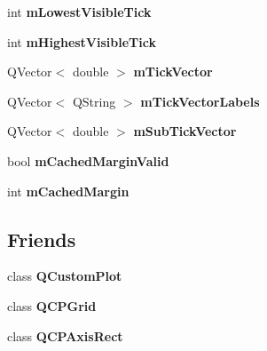 \begin{DoxyCompactItemize}
\item 
\hypertarget{classQCPAxis_aebb24ba8734b7e054efc6e1ecc5414c7}{}int {\bfseries m\+Lowest\+Visible\+Tick}\label{classQCPAxis_aebb24ba8734b7e054efc6e1ecc5414c7}

\item 
\hypertarget{classQCPAxis_abb3b3ccce7e9779fef2be91ce1a46ef0}{}int {\bfseries m\+Highest\+Visible\+Tick}\label{classQCPAxis_abb3b3ccce7e9779fef2be91ce1a46ef0}

\item 
\hypertarget{classQCPAxis_aae0f9b9973b85be601200f00f5825087}{}Q\+Vector$<$ double $>$ {\bfseries m\+Tick\+Vector}\label{classQCPAxis_aae0f9b9973b85be601200f00f5825087}

\item 
\hypertarget{classQCPAxis_aeee4bd0fca3f587eafe33843d1cb4f82}{}Q\+Vector$<$ Q\+String $>$ {\bfseries m\+Tick\+Vector\+Labels}\label{classQCPAxis_aeee4bd0fca3f587eafe33843d1cb4f82}

\item 
\hypertarget{classQCPAxis_a28353081e0ff35c3fe5ced923a287faa}{}Q\+Vector$<$ double $>$ {\bfseries m\+Sub\+Tick\+Vector}\label{classQCPAxis_a28353081e0ff35c3fe5ced923a287faa}

\item 
\hypertarget{classQCPAxis_a2cde37b6e385f47e11322df4ac1b0e9b}{}bool {\bfseries m\+Cached\+Margin\+Valid}\label{classQCPAxis_a2cde37b6e385f47e11322df4ac1b0e9b}

\item 
\hypertarget{classQCPAxis_a48ace55cbd54f7241e7f1b06fd369b64}{}int {\bfseries m\+Cached\+Margin}\label{classQCPAxis_a48ace55cbd54f7241e7f1b06fd369b64}

\end{DoxyCompactItemize}
\subsection*{Friends}
\begin{DoxyCompactItemize}
\item 
\hypertarget{classQCPAxis_a1cdf9df76adcfae45261690aa0ca2198}{}class {\bfseries Q\+Custom\+Plot}\label{classQCPAxis_a1cdf9df76adcfae45261690aa0ca2198}

\item 
\hypertarget{classQCPAxis_a061e177f585549fc31f780852e2bd6fe}{}class {\bfseries Q\+C\+P\+Grid}\label{classQCPAxis_a061e177f585549fc31f780852e2bd6fe}

\item 
\hypertarget{classQCPAxis_acbf20ecb140f66c5fd1bc64ae0762990}{}class {\bfseries Q\+C\+P\+Axis\+Rect}\label{classQCPAxis_acbf20ecb140f66c5fd1bc64ae0762990}

\end{DoxyCompactItemize}


